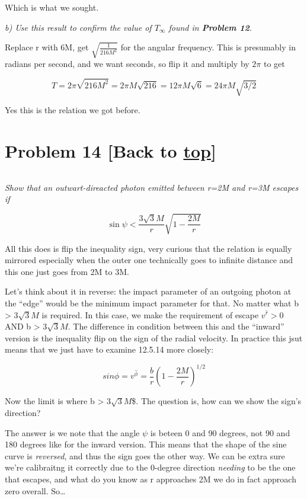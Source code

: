\documentclass[landscape,letterpaper,10pt,english]{article}
\begin{document}
Which is what we sought.

    \emph{b) Use this result to confirm the value of \(T_\infty\) found in
\textbf{Problem 12}.}

    Replace r with 6M, get \(\sqrt{\frac{1}{216M^2}}\) for the angular
frequency. This is presumably in radians per second, and we want
seconds, so flip it and multiply by \(2\pi\) to get

\[ T = 2\pi\sqrt{216M^2} = 2\pi M \sqrt{216} = 12 \pi M \sqrt{6} = 24 \pi M \sqrt{3/2} \]

Yes this is the relation we got before.

    \hypertarget{problem-14-back-to-top}{%
\section{\texorpdfstring{Problem 14 {[}Back to
\hyperref[toc]{top}{]}}{Problem 14 {[}Back to {]}}}\label{problem-14-back-to-top}}

\[\label{P14}\]

\emph{Show that an outwart-direacted photon emitted between r=2M and
r=3M escapes if}

\[ \sin \psi < \frac{3\sqrt{3} M}{r} \sqrt{1-\frac{2M}{r}} \]

    All this does is flip the inequality sign, very curious that the
relation is equally mirrored especially when the outer one technically
goes to infinite distance and this one just goes from 2M to 3M.

Let's think about it in reverse: the impact parameter of an outgoing
photon at the ``edge'' would be the minimum impact parameter for that.
No matter what b \textgreater{} \(3\sqrt{3}M\) is required. In this
case, we make the requirement of escape \(v^{\hat r} > 0\) AND b
\textgreater{} \(3\sqrt{3}M\). The difference in condition between this
and the ``inward'' version is the inequality flip on the sign of the
radial velocity. In practice this jsut means that we just have to
examine 12.5.14 more closely:

\[ sin\phi = v^\hat\phi = \frac{b}{r} \left( 1-\frac{2M}{r} \right)^{1/2} \]

Now the limit is where b \textgreater{} \(3\sqrt{3}M\)\$. The question
is, how can we show the sign's direction?

    The answer is we note that the angle \(\psi\) is beteen 0 and 90
degrees, not 90 and 180 degrees like for the inward version. This means
that the shape of the sine curve is \emph{reversed}, and thus the sign
goes the other way. We can be extra sure we're calibraitng it correctly
due to the 0-degree direction \emph{needing} to be the one that escapes,
and what do you know as r approaches 2M we do in fact approach zero
overall. So\ldots{}
\end{document}
